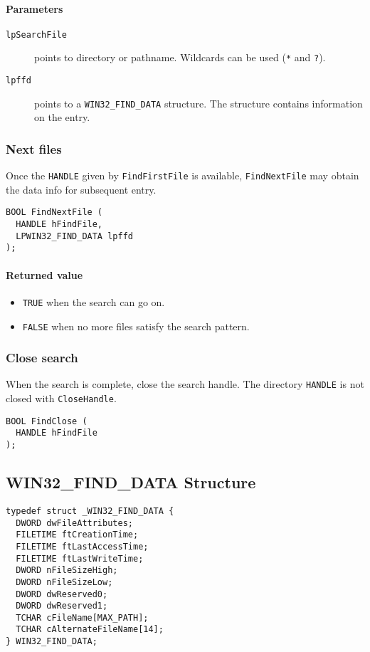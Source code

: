 \paragraph{Parameters}
\begin{description}
\item [\texttt{lpSearchFile}] points to directory or pathname. Wildcards can be used (\texttt{*} and \texttt{?}).
\item [\texttt{lpffd}] points to a \texttt{WIN32\_FIND\_DATA} structure. The structure contains information on the entry.
\end{description}

\subsubsection{Next files}
Once the \texttt{HANDLE} given by \texttt{FindFirstFile} is available, \texttt{FindNextFile} may obtain the data info for subsequent entry.

\begin{verbatim}
BOOL FindNextFile (
  HANDLE hFindFile,
  LPWIN32_FIND_DATA lpffd
);
\end{verbatim}

\paragraph{Returned value}
\begin{itemize}
\item \texttt{TRUE} when the search can go on.
\item \texttt{FALSE} when no more files satisfy the search pattern.
\end{itemize}

\subsubsection{Close search}
When the search is complete, close the search handle. The directory \texttt{HANDLE} is not closed with \texttt{CloseHandle}.
\begin{verbatim}
BOOL FindClose (
  HANDLE hFindFile
);
\end{verbatim}

\subsection{WIN32\_FIND\_DATA Structure}
\begin{verbatim}
typedef struct _WIN32_FIND_DATA {
  DWORD dwFileAttributes;
  FILETIME ftCreationTime;
  FILETIME ftLastAccessTime;
  FILETIME ftLastWriteTime;
  DWORD nFileSizeHigh;
  DWORD nFileSizeLow;
  DWORD dwReserved0;
  DWORD dwReserved1;
  TCHAR cFileName[MAX_PATH];
  TCHAR cAlternateFileName[14];
} WIN32_FIND_DATA;
\end{verbatim}

